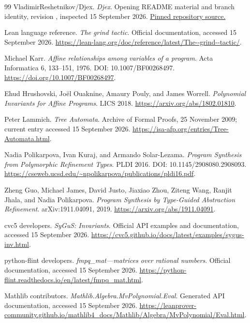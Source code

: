 \begin{thebibliography}{99}
VladimirReshetnikov/Djex. \emph{Djex}. Opening README material and branch identity,
revision , inspected 15 September 2026.
\href{https://github.com/VladimirReshetnikov/Djex/blob/e8778f4ebd63e1f9b9b410fa4de8d14a8a04c9e5/README.md}{Pinned repository source.}

Lean language reference. \emph{The grind tactic}. Official documentation,
accessed 15 September 2026.
\url{https://lean-lang.org/doc/reference/latest/The--grind--tactic/}.

Michael Karr. \emph{Affine relationships among variables of a program}.
Acta Informatica 6, 133--151, 1976. DOI: 10.1007/BF00268497.
\url{https://doi.org/10.1007/BF00268497}.

Ehud Hrushovski, Jo\"el Ouaknine, Amaury Pouly, and James Worrell.
\emph{Polynomial Invariants for Affine Programs}. LICS 2018.
\url{https://arxiv.org/abs/1802.01810}.

Peter Lammich. \emph{Tree Automata}. Archive of Formal Proofs, 25 November 2009;
current entry accessed 15 September 2026.
\url{https://isa-afp.org/entries/Tree-Automata.html}.

Nadia Polikarpova, Ivan Kuraj, and Armando Solar-Lezama.
\emph{Program Synthesis from Polymorphic Refinement Types}. PLDI 2016.
DOI: 10.1145/2908080.2908093.
\url{https://cseweb.ucsd.edu/~npolikarpova/publications/pldi16.pdf}.

Zheng Guo, Michael James, David Justo, Jiaxiao Zhou, Ziteng Wang, Ranjit Jhala,
and Nadia Polikarpova. \emph{Program Synthesis by Type-Guided Abstraction
Refinement}. arXiv:1911.04091, 2019.
\url{https://arxiv.org/abs/1911.04091}.

cvc5 developers. \emph{SyGuS: Invariants}. Official API examples and documentation,
accessed 15 September 2026.
\url{https://cvc5.github.io/docs/latest/examples/sygus-inv.html}.

python-flint developers. \emph{fmpq\_mat---matrices over rational numbers}.
Official documentation, accessed 15 September 2026.
\url{https://python-flint.readthedocs.io/en/latest/fmpq_mat.html}.

Mathlib contributors. \emph{Mathlib.Algebra.MvPolynomial.Eval}.
Generated API documentation, accessed 15 September 2026.
\url{https://leanprover-community.github.io/mathlib4_docs/Mathlib/Algebra/MvPolynomial/Eval.html}.
\end{thebibliography}
